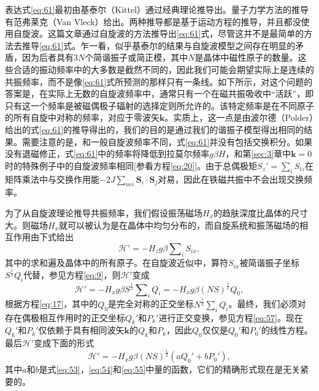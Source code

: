 \documentclass{article}
\begin{document}
表达式\eqref{eq:61}最初由基泰尔（Kittel）通过经典理论推导出。量子力学方法的推导有范弗莱克（Van Vleck）给出。两种推导都是基于运动方程的推导，并且都没使用自旋波。这篇文章通过自旋波的方法推导出\eqref{eq:61}式，尽管这并不是最简单的方法去推导\eqref{eq:61}式。乍一看，似乎基泰尔的结果与自旋波模型之间存在明显的矛盾，因为后者具有$3N$个简谐振子或简正模，其中$N$是晶体中磁性原子的数量。这些合适的振动频率中的大多数是截然不同的，因此我们可能会期望实际上是连续的共振频率，而不是像\eqref{eq:61}式所预测的那样只有一条线。如下所示，对这个问题的答案是，在实际上无数的自旋波频率中，通常只有一个在磁共振吸收中“活跃”，即只有这一个频率是被磁偶极子辐射的选择定则所允许的。该特定频率是在不同原子的所有自旋中对称的频率，对应于零波矢$\mathbf{k}$。实质上，这一点是由波尔德（Polder）给出的式\eqref{eq:61}的推导得出的，我们的目的是通过我们的谐振子模型得出相同的结果。需要注意的是，和一般自旋波频率不同，式\eqref{eq:61}并没有包括交换积分。如果没有退磁修正，式\eqref{eq:61}中的频率将降低到拉莫尔频率$g\beta H$，和第\ref{sec:3}章中$\mathbf{k}=0$时的特殊例子中的自旋波频率相同[参看方程\eqref{eq:20}]。由于总偶极矩$S_z'=\sum_i S_{iz}$在矩阵乘法中与交换作用能$-2J\sum_{\mathit{nei}}\mathbf{S}_i\cdot\mathbf{S}_j$对易，因此在铁磁共振中不会出现交换频率。

为了从自旋波理论推导共振频率，我们假设振荡磁场$H_x$的趋肤深度比晶体的尺寸大。则磁场$H_x$就可以被认为是在晶体中均匀分布的，而自旋系统和振荡磁场的相互作用由下式给出
\begin{equation} \label{eq:62}
\mathcal{H}'=-H_zg\beta\sum\nolimits_iS_{ix},
\end{equation}
其中的求和遍及晶体中的所有原子。在自旋波近似中，算符$S_{ix}$被简谐振子坐标$S^{\frac{1}{2}}Q_i$代替，参见方程\eqref{eq:9}，则$\mathcal{H}'$变成
\begin{equation} \label{eq:63}
\mathcal{H}'=-H_xg\beta S^{\frac{1}{2}}\sum\nolimits_iQ_i=-H_xg\beta(NS)^{\frac{1}{2}}Q_0,
\end{equation}
根据方程\eqref{eq:17}，其中的$Q_0$是完全对称的正交坐标$N^\frac{1}{2}\sum_i Q_i$。最终，我们必须对存在偶极相互作用时的正交坐标$Q_k'$和$P_k'$进行正交变换，参见方程\eqref{eq:57}。现在$Q_k'$和$P_k'$仅依赖于具有相同波矢$\mathbf{k}$的$Q_k$和$P_k$，因此$Q_0$仅仅是$Q_0'$和$P_0'$的线性方程。最后$\mathcal{H}'$变成下面的形式
\begin{equation} \label{eq:64}
\mathcal{H}'=-H_xg\beta(NS)^{\frac{1}{2}}(aQ_0'+bP_0'),
\end{equation}
其中$a$和$b$是式\eqref{eq:53}，\eqref{eq:54}和\eqref{eq:55}中量的函数，它们的精确形式现在是无关紧要的。
\end{document}
